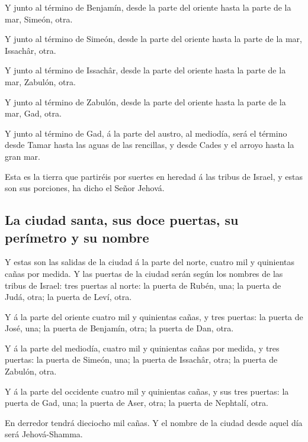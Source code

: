  Y junto al término de Benjamín, desde la parte del oriente
hasta la parte de la mar, Simeón, otra.

 Y junto al término de Simeón, desde la parte del oriente
hasta la parte de la mar, Issachâr, otra.

 Y junto al término de Issachâr, desde la parte del oriente
hasta la parte de la mar, Zabulón, otra.

 Y junto al término de Zabulón, desde la parte del oriente
hasta la parte de la mar, Gad, otra.

 Y junto al término de Gad, á la parte del austro, al
mediodía, será el término desde Tamar hasta las aguas de las rencillas,
y desde Cades y el arroyo hasta la gran mar.

 Esta es la tierra que partiréis por suertes en heredad á
las tribus de Israel, y estas son sus porciones, ha dicho el Señor
Jehová.

\hypertarget{la-ciudad-santa-sus-doce-puertas-su-peruxedmetro-y-su-nombre}{%
\subsection{La ciudad santa, sus doce puertas, su perímetro y su
nombre}\label{la-ciudad-santa-sus-doce-puertas-su-peruxedmetro-y-su-nombre}}

 Y estas son las salidas de la ciudad á la parte del norte,
cuatro mil y quinientas cañas por medida.  Y las puertas de
la ciudad serán según los nombres de las tribus de Israel: tres puertas
al norte: la puerta de Rubén, una; la puerta de Judá, otra; la puerta de
Leví, otra.

 Y á la parte del oriente cuatro mil y quinientas cañas, y
tres puertas: la puerta de José, una; la puerta de Benjamín, otra; la
puerta de Dan, otra.

 Y á la parte del mediodía, cuatro mil y quinientas cañas
por medida, y tres puertas: la puerta de Simeón, una; la puerta de
Issachâr, otra; la puerta de Zabulón, otra.

 Y á la parte del occidente cuatro mil y quinientas cañas,
y sus tres puertas: la puerta de Gad, una; la puerta de Aser, otra; la
puerta de Nephtalí, otra.

 En derredor tendrá dieciocho mil cañas. Y el nombre de la
ciudad desde aquel día será Jehová-Shamma.
